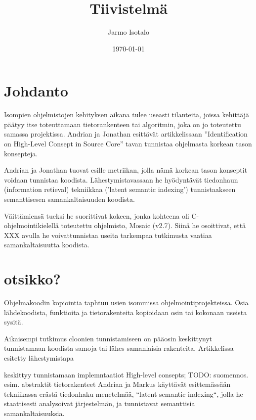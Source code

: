 \documentclass[finnish]{../tktltiki2}
\title{Tiivistelmä}
\author{Jarmo Isotalo}
\date{\today}
\theoremstyle{definition}
\theoremstyle{remark}
\begin{document}

\frontmatter      %

\maketitle        %


\mainmatter
\section{Johdanto}
Isompien ohjelmistojen kehityksen aikana tulee useasti tilanteita, joissa kehittäjä päätyy itse toteuttamaan
tietorankenteen tai algoritmin, joka on jo toteutettu samassa projektissa. Andrian ja Jonathan esittävät artikkelissaan
''Identification on High-Level Consept in Source Core''\cite{marcus2001identification}
tavan tunnistaa ohjelmasta korkean tason konsepteja.

Andrian ja Jonathan tuovat esille metriikan, jolla nämä korkean tason konseptit voidaan tunnistaa koodista.
Lähestymistavassaan he hyödyntävät tiedonhaun (information retieval) tekniikkaa ('latent semantic indexing')
tunnistaakseen semanttisesen
samankaltaisuuden koodista.

Väittämiensä tueksi he suorittivat kokeen, jonka kohteena oli C-ohjelmointikielellä toteutettu ohjelmisto,
Mosaic (v2.7). Siinä he osoittivat, että XXX avulla he voivattunnistaa useita tarkempaa tutkimusta vaatiaa
samankaltaisuutta koodista.


\section{otsikko?}
Ohjelmakoodin kopiointia taphtuu usien isommissa ohjelmointiprojekteissa. Osia lähdekoodista, funktioita ja
tietorakenteita kopioidaan osin tai kokonaan useista sysitä.

Aikaisempi tutkimus cloonien tunnistamiseen on pääosin keskittynyt tunnistamaan koodista samoja tai lähes samanlaisia
rakenteita. Artikkelissa esitetty lähestymistapa

keskittyy tunnistamaan implemntaatiot High-level consepts; TODO: suomennos. esim. abstraktit tietorakenteet
Andrian ja Markus käyttävät esittemässään tekniikassa erästä tiedonhaku menetelmää, ``latent semantic indexing``,
jolla he staattisesti analysoivat järjestelmän, ja
tunnistavat semanttisia samankaltaisuuksia.
\end{document}
